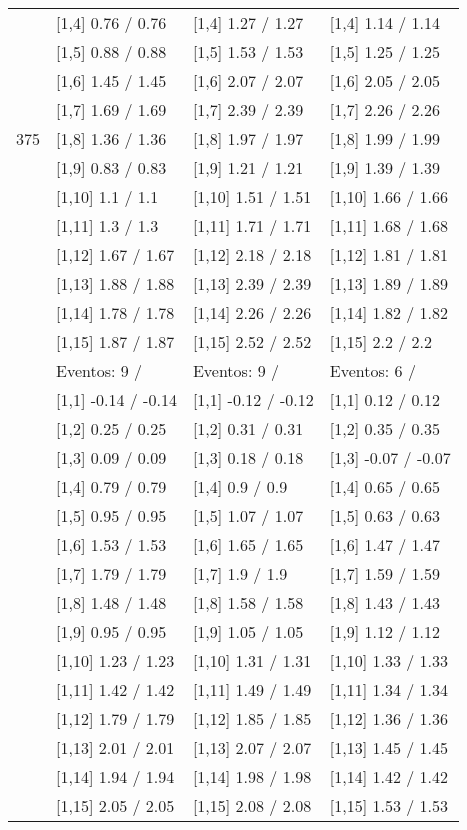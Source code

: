 \begin{table}
\begin{tabular}[t]{llll}
\addlinespace
 & {}[1,4] 0.76  / 0.76 & {}[1,4] 1.27  / 1.27 & {}[1,4] 1.14  / 1.14\\
 & {}[1,5] 0.88  / 0.88 & {}[1,5] 1.53  / 1.53 & {}[1,5] 1.25  / 1.25\\
 & {}[1,6] 1.45  / 1.45 & {}[1,6] 2.07  / 2.07 & {}[1,6] 2.05  / 2.05\\
 & {}[1,7] 1.69  / 1.69 & {}[1,7] 2.39  / 2.39 & {}[1,7] 2.26  / 2.26\\
375 & {}[1,8] 1.36  / 1.36 & {}[1,8] 1.97  / 1.97 & {}[1,8] 1.99  / 1.99\\
\addlinespace
 & {}[1,9] 0.83  / 0.83 & {}[1,9] 1.21  / 1.21 & {}[1,9] 1.39  / 1.39\\
 & {}[1,10] 1.1  / 1.1 & {}[1,10] 1.51  / 1.51 & {}[1,10] 1.66  / 1.66\\
 & {}[1,11] 1.3  / 1.3 & {}[1,11] 1.71  / 1.71 & {}[1,11] 1.68  / 1.68\\
 & {}[1,12] 1.67  / 1.67 & {}[1,12] 2.18  / 2.18 & {}[1,12] 1.81  / 1.81\\
 & {}[1,13] 1.88  / 1.88 & {}[1,13] 2.39  / 2.39 & {}[1,13] 1.89  / 1.89\\
\addlinespace
 & {}[1,14] 1.78  / 1.78 & {}[1,14] 2.26  / 2.26 & {}[1,14] 1.82  / 1.82\\
 & {}[1,15] 1.87  / 1.87 & {}[1,15] 2.52  / 2.52 & {}[1,15] 2.2  / 2.2\\
 & Eventos:  9 / & Eventos:  9 / & Eventos:  6 /\\
 & {}[1,1] -0.14  / -0.14 & {}[1,1] -0.12  / -0.12 & {}[1,1] 0.12  / 0.12\\
 & {}[1,2] 0.25  / 0.25 & {}[1,2] 0.31  / 0.31 & {}[1,2] 0.35  / 0.35\\
\addlinespace
 & {}[1,3] 0.09  / 0.09 & {}[1,3] 0.18  / 0.18 & {}[1,3] -0.07  / -0.07\\
 & {}[1,4] 0.79  / 0.79 & {}[1,4] 0.9  / 0.9 & {}[1,4] 0.65  / 0.65\\
 & {}[1,5] 0.95  / 0.95 & {}[1,5] 1.07  / 1.07 & {}[1,5] 0.63  / 0.63\\
 & {}[1,6] 1.53  / 1.53 & {}[1,6] 1.65  / 1.65 & {}[1,6] 1.47  / 1.47\\
 & {}[1,7] 1.79  / 1.79 & {}[1,7] 1.9  / 1.9 & {}[1,7] 1.59  / 1.59\\
\addlinespace
500 & {}[1,8] 1.48  / 1.48 & {}[1,8] 1.58  / 1.58 & {}[1,8] 1.43  / 1.43\\
 & {}[1,9] 0.95  / 0.95 & {}[1,9] 1.05  / 1.05 & {}[1,9] 1.12  / 1.12\\
 & {}[1,10] 1.23  / 1.23 & {}[1,10] 1.31  / 1.31 & {}[1,10] 1.33  / 1.33\\
 & {}[1,11] 1.42  / 1.42 & {}[1,11] 1.49  / 1.49 & {}[1,11] 1.34  / 1.34\\
 & {}[1,12] 1.79  / 1.79 & {}[1,12] 1.85  / 1.85 & {}[1,12] 1.36  / 1.36\\
\addlinespace
 & {}[1,13] 2.01  / 2.01 & {}[1,13] 2.07  / 2.07 & {}[1,13] 1.45  / 1.45\\
 & {}[1,14] 1.94  / 1.94 & {}[1,14] 1.98  / 1.98 & {}[1,14] 1.42  / 1.42\\
 & {}[1,15] 2.05  / 2.05 & {}[1,15] 2.08  / 2.08 & {}[1,15] 1.53  / 1.53\\
\bottomrule
\end{tabular}
\end{table}
